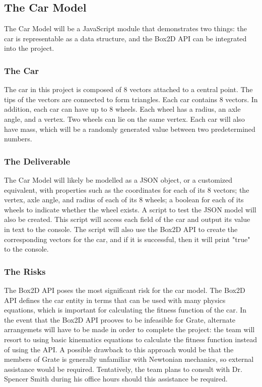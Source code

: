 \documentclass{article}
\begin{document}
\subsection{The Car Model}
The Car Model will be a JavaScript module that demonstrates two things: the car 
is representable as a data structure, and the Box2D API can be integrated into 
the project. 

\subsubsection{The Car}
The car in this project is composed of 8 vectors attached to a central point. 
The 
tips of the vectors are connected to form triangles. Each car contains 8 
vectors. In addition, each car can have up to 8 wheels. Each wheel has a radius, 
an axle angle, and a vertex. Two wheels can lie on the same vertex. Each car 
will also have mass, which will be a randomly generated value between two 
predetermined numbers.

\subsubsection{The Deliverable}
The Car Model will likely be modelled as a JSON object, or a customized 
equivalent, with properties such as the coordinates for each of its 8 vectors; 
the vertex, axle angle, and radius of each of its 8 wheels; a boolean for each 
of its wheels to indicate whether the wheel exists. A script to test the JSON 
model will also be created. This script will access each field of the car and 
output its value in text to the console. The script will also use the Box2D API 
to create the corresponding vectors for the car, and if it is successful, then 
it will print "true" to the console.

\subsubsection{The Risks}
The Box2D API poses the most significant risk for the car model. The Box2D API 
defines the car entity in terms that can be used with many physics equations, 
which is important for calculating the fitness function of the car. In the event 
that the Box2D API prooves to be infeasible for Grate, alternate arrangemets 
will have to be made in order to complete the project: the team will resort to 
using basic kinematics equations to calculate the fitness function instead of 
using the API. A possible drawback to this approach would be that the members of 
Grate is generally unfamiliar with Newtonian mechanics, so external assistance 
would be required. Tentatively, the team plans to consult with Dr. Spencer Smith 
during his office hours should this assistance be required.
\end{document}
